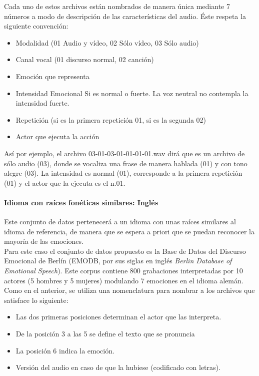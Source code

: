 \documentclass[11pt,a4paper,spanish]{book}
\begin{document}
	Cada uno de estos archivos están nombrados de manera única mediante 7 números a modo de descripción de las características del audio. Éste respeta la siguiente convención:
	\begin{itemize}
		\item Modalidad (01 Audio y vídeo, 02 Sólo vídeo, 03 Sólo audio)
		\item Canal vocal (01 discurso normal, 02 canción)
		\item Emoción que representa
		\item Intensidad Emocional Si es normal o fuerte. La voz neutral no contempla la intensidad fuerte.
		\item Repetición (si es la primera repetición 01, si es la segunda 02)
		\item Actor que ejecuta la acción
	\end{itemize}

	Así por ejemplo, el archivo 03-01-03-01-01-01-01.wav dirá que es un archivo de sólo audio (03), donde se vocaliza una frase de manera hablada (01) y con tono alegre (03). La intensidad es normal (01), corresponde a la primera repetición (01) y el actor que la ejecuta es el n.01.

	
	\paragraph{Idioma con raíces fonéticas similares: Inglés} Este conjunto de datos pertenecerá a un idioma con unas raíces similares al idioma de referencia, de manera que se espera a priori que se puedan reconocer la mayoría de las emociones.\\
	
	Para este caso el conjunto de datos propuesto es la Base de Datos del Discurso Emocional de Berlín (EMODB, por sus siglas en inglés \emph{Berlin Database of Emotional Speech}). Este corpus contiene 800 grabaciones interpretadas por 10 actores (5 hombres y 5 mujeres) modulando 7 emociones en el idioma alemán. Como en el anterior, se utiliza una nomenclatura para nombrar a los archivos que satisface lo siguiente:
	\begin{itemize}
		\item Las dos primeras posiciones determinan el actor que las interpreta.
		\item De la posición 3 a las 5 se define el texto que se pronuncia
		\item La posición 6 indica la emoción.
		\item Versión del audio en caso de que la hubiese (codificado con letras).
	\end{itemize}
\end{document}
